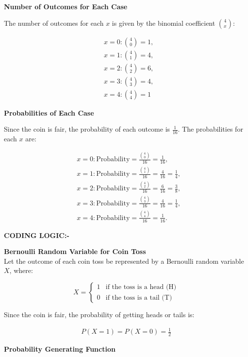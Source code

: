 \documentclass[journal]{IEEEtran}
\numberwithin{equation}{enumi}
\numberwithin{figure}{enumi}
\begin{document}
\textbf{Number of Outcomes for Each Case}

The number of outcomes for each $ x $ is given by the binomial coefficient $ \binom{4}{x} $:

\begin{align}
    &x = 0: \binom{4}{0} = 1, \\
    &x = 1: \binom{4}{1} = 4, \\
    &x = 2: \binom{4}{2} = 6, \\
    &x = 3: \binom{4}{3} = 4, \\
    &x = 4: \binom{4}{4} = 1
\end{align}

\textbf{Probabilities of Each Case}

Since the coin is fair, the probability of each outcome is $ \frac{1}{16} $. The probabilities for each $ x $ are:

\begin{align}
    &x = 0: \text{Probability} = \frac{\binom{4}{0}}{16} = \frac{1}{16}, \\
    &x = 1: \text{Probability} = \frac{\binom{4}{1}}{16} = \frac{4}{16} = \frac{1}{4}, \\
    &x = 2: \text{Probability} = \frac{\binom{4}{2}}{16} = \frac{6}{16} = \frac{3}{8}, \\
    &x = 3: \text{Probability} = \frac{\binom{4}{3}}{16} = \frac{4}{16} = \frac{1}{4}, \\
    &x = 4: \text{Probability} = \frac{\binom{4}{4}}{16} = \frac{1}{16}.
\end{align}


\textbf{CODING LOGIC:-}


\textbf{Bernoulli Random Variable for Coin Toss}\\
Let the outcome of each coin toss be represented by a Bernoulli random variable \( X \), where:

\[
X = 
\begin{cases} 
1 & \text{if the toss is a head (H)} \\
0 & \text{if the toss is a tail (T)}
\end{cases}
\]

Since the coin is fair, the probability of getting heads or tails is:

\begin{align}
P(X = 1) = P(X = 0) = \frac{1}{2}
\end{align}

 \textbf{Probability Generating Function}
\end{document}
